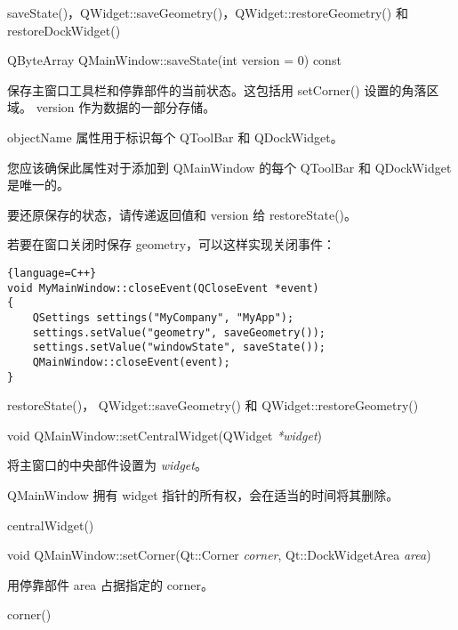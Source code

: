 \begin{notice}[另请参阅]
saveState()，QWidget::saveGeometry()，QWidget::restoreGeometry() 和 restoreDockWidget()
\end{notice}

\splitLine

QByteArray QMainWindow::saveState(int version = 0) const

保存主窗口工具栏和停靠部件的当前状态。这包括用 setCorner() 设置的角落区域。
version 作为数据的一部分存储。

objectName 属性用于标识每个 QToolBar 和 QDockWidget。

您应该确保此属性对于添加到 QMainWindow 的每个 QToolBar 和 QDockWidget 是唯一的。

要还原保存的状态，请传递返回值和 version 给 restoreState()。

若要在窗口关闭时保存 geometry，可以这样实现关闭事件：

\begin{lstlisting}{language=C++}
void MyMainWindow::closeEvent(QCloseEvent *event)
{
    QSettings settings("MyCompany", "MyApp");
    settings.setValue("geometry", saveGeometry());
    settings.setValue("windowState", saveState());
    QMainWindow::closeEvent(event);
}
\end{lstlisting}

\begin{notice}[另请参阅]
restoreState()， QWidget::saveGeometry() 和 QWidget::restoreGeometry()
\end{notice}

\splitLine

void QMainWindow::setCentralWidget(QWidget \emph{*widget})

将主窗口的中央部件设置为 \emph{widget}。

\begin{notice}
QMainWindow 拥有 widget 指针的所有权，会在适当的时间将其删除。
\end{notice}

\begin{notice}[另请参阅]
centralWidget()
\end{notice}

\splitLine

void QMainWindow::setCorner(Qt::Corner \emph{corner}, Qt::DockWidgetArea \emph{area})

用停靠部件 area 占据指定的 corner。

\begin{notice}[另请参阅]
corner()
 \end{notice}

